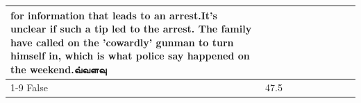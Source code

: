 \begin{table}[H]
\begin{tabular}{lllrlllll}
for information that leads to an arrest.It's unclear if such a tip led to the arrest. The family have called on the 'cowardly' gunman to turn himself in, which is what police say happened on the weekend.வ்வளவு \\
\cline{1-9}
False & 47.5%
\end{tabular}
\end{table}
